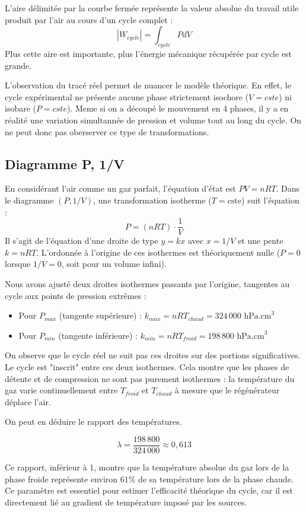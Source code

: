 \documentclass[a4paper,9pt,french]{scrartcl}
\begin{document}
L'aire délimitée par la courbe fermée représente la valeur absolue du travail utile produit par l'air au cours d'un cycle complet :
$$|W_{cycle}| = \int_{cycle} P dV$$
Plus cette aire est importante, plus l'énergie mécanique récupérée par cycle est grande.

L'observation du tracé réel permet de nuancer le modèle théorique. En effet, le cycle expérimental ne présente aucune phase strictement isochore ($V=cste$) ni isobare ($P=cste$).
Meme si on a découpé le mouvement en 4 phases, il y a en réalité une variation simultannée de pression et volume tout au long du cycle. On ne peut donc pas oberserver ce type de transformations.
\subsection{Diagramme P, 1/V}
En considérant l'air comme un gaz parfait, l'équation d'état est $PV = nRT$. Dans le diagramme $(P, 1/V)$, une transformation isotherme ($T = \text{cste}$) suit l'équation :
$$P = (nRT) \cdot \frac{1}{V}$$
Il s'agit de l'équation d'une droite de type $y = kx$ avec $x = 1/V$ et une pente $k = nRT$. 
L'{ordonnée à l'origine} de ces isothermes est théoriquement nulle ($P = 0$ lorsque $1/V = 0$, soit pour un volume infini).

Nous avons ajusté deux droites isothermes passants par l'origine, tangentes au cycle aux points de pression extrêmes :
\begin{itemize}
    \item Pour $P_{max}$ (tangente supérieure) : $k_{max} = nRT_{chaud} = 324\,000 \text{ hPa.cm}^3$
    \item Pour $P_{min}$ (tangente inférieure) : $k_{min} = nRT_{froid} = 198\,800 \text{ hPa.cm}^3$
\end{itemize}



On observe que le cycle réel ne suit pas ces droites sur des portions significatives. Le cycle est "inscrit" entre ces deux isothermes. Cela montre que les phases de détente et de compression ne sont pas purement isothermes : la température du gaz varie continuellement entre $T_{froid}$ et $T_{chaud}$ à mesure que le régénérateur déplace l'air.

On peut en déduire le rapport des températures.

$$\lambda = \frac{198\,800}{324\,000} \approx 0,613$$

Ce rapport, inférieur à 1, montre que la température absolue du gaz lors de la phase froide représente environ $61\%$ de sa température lors de la phase chaude. Ce paramètre est essentiel pour estimer l'efficacité théorique du cycle, car il est directement lié au gradient de température imposé par les sources.
\end{document}
